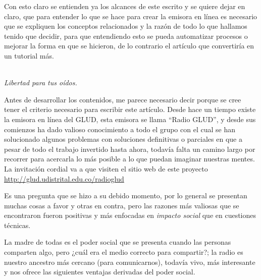 \begin{multicols}{2}
Con esto claro se entienden ya los alcances de este escrito y se quiere dejar en claro, que para entender lo que se hace para crear la emisora en línea es necesario que se expliquen los conceptos relacionados y la razón de todo lo que hallamos tenido que decidir, para que entendiendo esto se pueda automatizar procesos o mejorar la forma en que se hicieron, de lo contrario el artículo que convertiría en un tutorial más.

\begin{entradilla} %
{\em {\color{introcolor}{Radio GLUD}} \\ Libertad para tus oídos.}
\end{entradilla}

Antes de desarrollar los contenidos, me parece necesario decir porque se cree tener el criterio necesario para escribir este artículo. Desde hace un tiempo existe la emisora en línea del GLUD, esta emisora se llama ``Radio GLUD'', y desde sus comienzos ha dado valioso conocimiento a todo el grupo con el cual se han solucionado algunos problemas con soluciones definitivas o parciales en que a pesar de todo el trabajo invertido hasta ahora, todavía falta un camino largo por recorrer para acercarla lo más posible a lo que puedan imaginar nuestras mentes.
La invitación cordial va a que visiten el sitio web de este proyecto \url{http://glud.udistrital.edu.co/radioglud}




Es una pregunta que se hizo a su debido momento, por lo general se presentan muchas cosas a favor y otras en contra, pero las razones más valiosas que se encontraron fueron positivas y más enfocadas en {\em impacto social} que en cuestiones técnicas. 



La madre de todas es el poder social que se presenta cuando las personas comparten algo, pero ¿cuál era el medio correcto para compartir?; la radio es nuestro ancestro más cercano (para comunicarnos), todavía vivo, más interesante y nos ofrece las siguientes ventajas derivadas del poder social.


\end{multicols}
